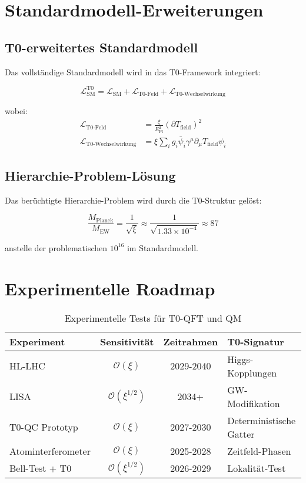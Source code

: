 \documentclass[12pt,a4paper]{article}
\newcommand{\xipar}{\xi}
\newcommand{\Tfield}{T_{\text{field}}}
\newcommand{\EPlanck}{E_{\text{Pl}}}
\begin{document}
	\section{Standardmodell-Erweiterungen}
	
	\subsection{T0-erweitertes Standardmodell}
	
	Das vollständige Standardmodell wird in das T0-Framework integriert:
	
	\begin{equation}
		\mathcal{L}_{\text{SM}}^{\text{T0}} = \mathcal{L}_{\text{SM}} + \mathcal{L}_{\text{T0-Feld}} + \mathcal{L}_{\text{T0-Wechselwirkung}}
	\end{equation}
	
	wobei:
	\begin{align}
		\mathcal{L}_{\text{T0-Feld}} &= \frac{\xipar}{\EPlanck^2} (\partial \Tfield)^2 \\
		\mathcal{L}_{\text{T0-Wechselwirkung}} &= \xipar \sum_i g_i \bar{\psi}_i \gamma^\mu \partial_\mu \Tfield \psi_i
	\end{align}
	
	\subsection{Hierarchie-Problem-Lösung}
	
	Das berüchtigte Hierarchie-Problem wird durch die T0-Struktur gelöst:
	
	\begin{equation}
		\frac{M_{\text{Planck}}}{M_{\text{EW}}} = \frac{1}{\sqrt{\xipar}} \approx \frac{1}{\sqrt{1.33 \times 10^{-4}}} \approx 87
	\end{equation}
	
	anstelle der problematischen $10^{16}$ im Standardmodell.
	
	\section{Experimentelle Roadmap}
	
	\begin{table}[htbp]
		\centering
		\begin{tabular}{lccl}
			\toprule
			\textbf{Experiment} & \textbf{Sensitivität} & \textbf{Zeitrahmen} & \textbf{T0-Signatur} \\
			\midrule
			HL-LHC & $\mathcal{O}(\xi)$ & 2029-2040 & Higgs-Kopplungen \\
			LISA & $\mathcal{O}(\xi^{1/2})$ & 2034+ & GW-Modifikation \\
			T0-QC Prototyp & $\mathcal{O}(\xi)$ & 2027-2030 & Deterministische Gatter \\
			Atominterferometer & $\mathcal{O}(\xi)$ & 2025-2028 & Zeitfeld-Phasen \\
			Bell-Test + T0 & $\mathcal{O}(\xi^{1/2})$ & 2026-2029 & Lokalität-Test \\
			\bottomrule
		\end{tabular}
		\caption{Experimentelle Tests für T0-QFT und QM}
		\label{tab:t0_experimental_tests}
	\end{table}
	
\end{document}
